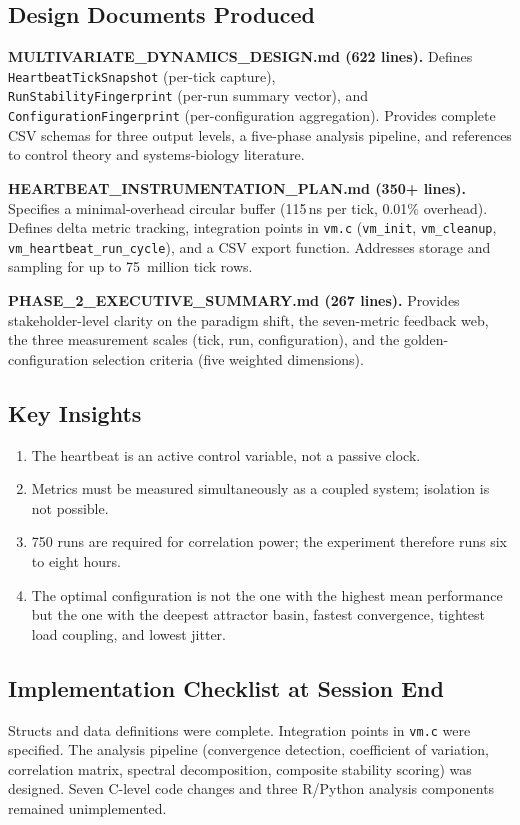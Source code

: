 \subsection{Design Documents Produced}

\textbf{MULTIVARIATE\_DYNAMICS\_DESIGN.md (622 lines).}
Defines \texttt{HeartbeatTickSnapshot} (per-tick capture), \\
\texttt{RunStabilityFingerprint} (per-run summary vector), and
\texttt{ConfigurationFingerprint} (per-configuration aggregation). Provides
complete CSV schemas for three output levels, a five-phase analysis pipeline,
and references to control theory and systems-biology literature.

\textbf{HEARTBEAT\_INSTRUMENTATION\_PLAN.md (350+ lines).}
Specifies a minimal-overhead circular buffer (115\,ns per tick, 0.01\%
overhead). Defines delta metric tracking, integration points in
\texttt{vm.c} (\texttt{vm\_init}, \texttt{vm\_cleanup},
\texttt{vm\_heartbeat\_run\_cycle}), and a CSV export function. Addresses
storage and sampling for up to 75~million tick rows.

\textbf{PHASE\_2\_EXECUTIVE\_SUMMARY.md (267 lines).}
Provides stakeholder-level clarity on the paradigm shift, the seven-metric
feedback web, the three measurement scales (tick, run, configuration), and
the golden-configuration selection criteria (five weighted dimensions).

\subsection{Key Insights}

\begin{enumerate}
  \item The heartbeat is an active control variable, not a passive clock.
  \item Metrics must be measured simultaneously as a coupled system;
    isolation is not possible.
  \item 750 runs are required for correlation power; the experiment therefore
    runs six to eight hours.
  \item The optimal configuration is not the one with the highest mean
    performance but the one with the deepest attractor basin, fastest
    convergence, tightest load coupling, and lowest jitter.
\end{enumerate}

\subsection{Implementation Checklist at Session End}

Structs and data definitions were complete. Integration points in
\texttt{vm.c} were specified. The analysis pipeline (convergence detection,
coefficient of variation, correlation matrix, spectral decomposition,
composite stability scoring) was designed. Seven C-level code changes and
three R/Python analysis components remained unimplemented.
